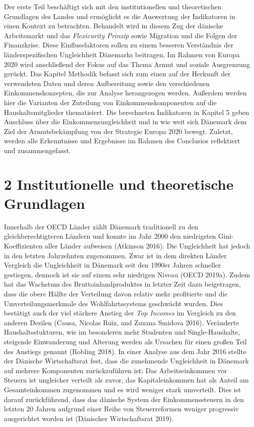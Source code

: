 \documentclass[12pt,]{article}
\begin{document}
Der erste Teil beschäftigt sich mit den institutionellen und
theoretischen Grundlagen des Landes und ermöglicht es die Auswertung der
Indikatoren in einen Kontext zu betrachten. Behandelt wird in diesem Zug
der dänische Arbeitsmarkt und das \emph{Flexicurity Prinzip} sowie
Migration und die Folgen der Finanzkrise. Diese Einflussfaktoren sollen
zu einem besseren Verständnis der länderspezifischen Ungleichheit
Dänemarks beitragen. Im Rahmen von Europa 2020 wird anschließend der
Fokus auf das Thema Armut und soziale Ausgrenzung gerückt. Das Kapitel
Methodik befasst sich zum einen auf der Herkunft der verwendeten Daten
und deren Aufbereitung sowie den verschiedenen Einkommenskonzepten, die
zur Analyse herangezogen werden. Außerdem werden hier die Varianten der
Zuteilung von Einkommenskomponenten auf die Haushaltsmitglieder
thematisiert. Die berechneten Indikatoren in Kapitel 5 geben Auschluss
über die Einkommensungleichheit und in wie weit sich Dänemark dem Ziel
der Armutsbekämpfung von der Strategie Europa 2020 bewegt. Zuletzt,
werden alle Erkenntnisse und Ergebnisse im Rahmen des Conclusios
reflektiert und zusammengefasst.

\section{2 Institutionelle und theoretische
Grundlagen}\label{institutionelle-und-theoretische-grundlagen}

Innerhalb der OECD Länder zählt Dänemark traditionell zu den
gleichberechtigteren Ländern und konnte im Jahr 2000 den niedrigsten
Gini-Koeffizienten aller Länder aufweisen (Atkinson 2016). Die
Ungleichheit hat jedoch in den letzten Jahrzehnten zugenommen. Zwar ist
in dem direkten Länder Vergleich die Ungleichheit in Dänemark seit den
1990er Jahren schneller gestiegen, dennoch ist sie auf einem sehr
niedrigen Niveau (OECD 2019a). Zudem hat das Wachstum des
Bruttoinlandproduktes in letzter Zeit dazu beigetragen, dass die obere
Hälfte der Verteilung davon relativ mehr profitierte und die
Umverteilungsmerkmale des Wohlfahrtssystems geschwächt wurden. Dies
bestätigt auch der viel stärkere Anstieg der \emph{Top Incomes} im
Vergleich zu den anderen Dezilen (Causa, Nicolas Ruiz, and Zuzana
Smidova 2016). Veränderte Haushaltsstukturen, wie im besonderen mehr
Studenten und Single-Haushalte, steigende Einwanderung und Alterung
werden als Ursachen für einen großen Teil des Anstiegs genannt (Robling
2018). In einer Analyse aus dem Jahr 2016 stellte der Dänische
Wirtschaftsrat fest, dass die zunehmende Ungleichheit in Dänemark auf
mehrere Komponenten zurückzuführen ist: Das Arbeitseinkommen vor Steuern
ist ungleicher verteilt als zuvor, das Kapitaleinkommen hat als Anteil
am Gesamteinkommen zugenommen und es wird weniger stark umverteilt. Dies
ist darauf zurückführend, dass das dänische System der Einkommenssteuern
in den letzten 20 Jahren aufgrund einer Reihe von Steuerreformen weniger
progressiv ausgerichtet worden ist (Dänischer Wirtschaftsrat 2019).
\end{document}
